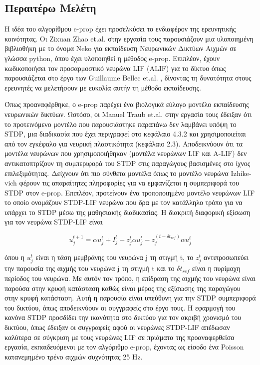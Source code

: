 \documentclass[12pt]{report}
\begin{document}
\subsection{Περαιτέρω Μελέτη}

Η ιδέα του αλγορίθμου \textlatin{e-prop} έχει προσελκύσει το ενδιαφέρον της ερευνητικής κοινότητας. Οι \textlatin{Zixuan Zhao et.al.} στην εργασία τους \cite{Brasoveanu2020} παρουσιάζουν μια υλοποιημένη βιβλιοθήκη με το όνομα \textlatin{Neko} για εκπαίδευση Νευρωνικών Δικτύων Αιχμών σε γλώσσα \textlatin{python}, όπου έχει υλοποιηθεί η μέθοδος \textlatin{e-prop}. Επιπλέον, έχουν κωδικοποιήσει τον προσαρμοστικό νευρώνα \textlatin{LIF (ALIF)} για το δίκτυο όπως παρουσιάζεται στο έργο των \textlatin{Guillaume Bellec et.al.} \cite{Bellec2020}, δίνοντας τη δυνατότητα στους ερευνητές να μελετήσουν με ευκολία αυτήν τη μέθοδο εκπαίδευσης.

Όπως προαναφέρθηκε, ο \textlatin{e-prop} παρέχει ένα βιολογικά εύλογο μοντέλο εκπαίδευσης νευρωνικών δικτύων. Ωστόσο, οι \textlatin{Manuel Traub et.al.} στην εργασία τους \cite{Traub2020} έδειξαν ότι το προτεινόμενο μοντέλο που παρουσιάστηκε παραπάνω δεν λαμβάνει υπόψη το \textlatin{STDP}, μια διαδικασία που έχει περιγραφεί στο κεφάλαιο 4.3.2 και χρησιμοποιείται από τον εγκέφαλο για νευρική πλαστικότητα (κεφάλαιο 2.3). Αποδεικνύουν ότι τα μοντέλα νευρώνων που χρησιμοποιήθηκαν (μοντέλα νευρώνων \textlatin{LIF} και \textlatin{A-LIF}) δεν αντικατοπτρίζουν τη συμπεριφορά του \textlatin{STDP} στις παραγώγους βασισμένες στο ίχνος επιλεξιμότητας. Δείχνουν ότι πιο σύνθετα μοντέλα όπως το μοντέλο νευρώνα \textlatin{Izhikevich} φέρουν τις απαραίτητες πληροφορίες για να εμφανίζεται η συμπεριφορά του \textlatin{STDP} στον \textlatin{e-prop}. Επιπλέον, προτείνουν ένα τροποποιημένο μοντέλο νευρώνων \textlatin{LIF} το οποίο ονομάζουν \textlatin{STDP-LIF} νευρώνα που δρα με τον κατάλληλο τρόπο για να υπάρχει το \textlatin{STDP} μέσω της μαθησιακής διαδικασίας. Η διακριτή διαφορική εξίσωση για τον νευρώνα \textlatin{STDP-LIF} είναι

\begin{equation}
    u^{t+1}_j = \alpha u^t_j+I^t_j-z_j^t\alpha u^t_j-z_j^{(t-\delta t_{ref})}\alpha u^t_j
\end{equation}

όπου η \(u^t_j\) είναι η τάση μεμβράνης του νευρώνα \textlatin{j} τη στιγμή \textlatin{t}, το \(z_j^t\) αντιπροσωπεύει την παρουσία της αιχμής του νευρώνα \textlatin{j} τη στιγμή \textlatin{t} και το \(\delta t_{ref}\) είναι η πυρίμαχη περίοδος του νευρώνα. Με αυτόν τον τρόπο, η επίδραση της αιχμής του νευρώνα είναι παρούσα στην κρυφή κατάσταση καθώς είναι μέρος της εξίσωσης της παραγώγου στην κρυφή κατάσταση. Αυτή η παρουσία είναι υπεύθυνη για την \textlatin{STDP} συμπεριφορά του δικτύου, όπως αποδεικνύουν οι συγγραφείς στο έργο τους. Η εφαρμογή του κανόνα \textlatin{STDP} προσδίδει την ικανότητα στο δικτύου για τον ακριβή χρονισμό του δικτύου, όπως έδειξαν οι συγγραφείς αφού οι νευρώνες \textlatin{STDP-LIF} απέδωσαν καλύτερα σε σύγκριση με τους νευρώνες \textlatin{LIF} σε πριάματα της προαναφερθείσα εργασία, εκπαιδευόμενοι με τον αλγόριθμο \textlatin{e-prop}, έχοντας ως είσοδο ένα \textlatin{Poisson} κατανεμημένο τρένο αιχμών συχνότητας 25 \textlatin{Hz}.
\end{document}
